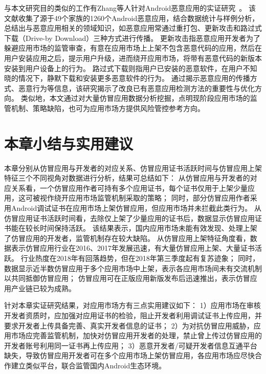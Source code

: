与本文研究目的类似的工作有Zhang等人针对Android恶意应用的实证研究~\cite{Zhou2012DissectingAM}。
该文献收集了源于49个家族的1260个Android恶意应用，结合数据统计与样例分析，总结出与恶意应用相关的领域知识，如恶意应用常通过重打包、更新攻击和路过式下载（Drive-by Download）三种方式进行传播。
更新攻击指恶意应用开发者为了躲避应用市场的监管审查，有意在应用市场上上架不包含恶意代码的应用，然后在用户安装应用之后，提示用户升级，进而绕开应用市场，将带有恶意代码的新版本安装到用户设备上的行为。
路过式下载则指用户已安装的恶意软件，在用户不知晓的情况下，静默下载和安装更多恶意软件的行为。
通过揭示恶意应用的传播方式、恶意行为等信息，该研究揭示了改良已有恶意应用检测方法的重要性与优化方向。
类似地，本文通过对大量仿冒应用数据分析挖掘，点明现阶段应用市场的监管机制、策略缺陷，也可为应用市场方提供风险管控参考方向。


\section{本章小结与实用建议}
本章分别从仿冒应用与开发者的对应关系、仿冒应用证书活跃时间与仿冒应用上架特征三个不同视角对数据进行分析，结果可总结如下：
从仿冒应用与开发者的对应关系看，一个仿冒应用作者可持有多个应用证书，每个证书仅用于上架少量应用，这可被视作绕开应用市场监管机制采取的策略；
同时，部分仿冒应用作者采用Android调试证书在应用市场上架仿冒应用，但应用市场并未拦截此类行为。
从仿冒应用证书活跃时间看，去除仅上架了少量应用的证书后，数据显示仿冒应用证书能在较长时间保持活跃。
该结果表示，国内应用市场未能有效发现、处理上架了仿冒应用的开发者，监管机制存在较大缺陷。
从仿冒应用上架特征角度看，数据表示仿冒应用行业在2016、2017年发展迅速，有大量仿冒应用上架、大量证书活跃。
行业热度在2018年有回落趋势，但在2018年第三季度起有复苏迹象；
同时，数据显示近半数仿冒应用于多个应用市场中上架，表示各应用市场间未有交流机制以共同抵御仿冒应用；
仿冒应用可在正版应用新版发布后迅速推出，表示仿冒应用产业链已较为成熟。

针对本章实证研究结果，对应用市场方有三点实用建议如下：
1）应用市场在审核开发者资质时，应加强对应用证书的检验，阻止开发者利用调试证书上传应用，并要求开发者上传具备完善、真实开发者信息的证书；
2）为对抗仿冒应用威胁，应用市场应完善监管机制，加快对仿冒应用开发者的处理，禁止曾上传过仿冒应用的开发者账号利用同一证书再上传应用；
3）恶意开发者/可疑开发者信息互通平台缺失，导致仿冒应用开发者可在多个应用市场上架仿冒应用，各应用市场应尽快合作建立类似平台，联合监管国内Android生态环境。
